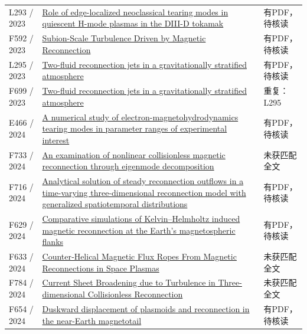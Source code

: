 \documentclass[UTF8,a4paper,11pt,openany,fontset=fandol]{ctexbook}
\begin{document}
\begin{longtable}{P{24mm}P{97mm}P{27mm}}
L293 / 2023 & \href{https://doi.org/10.1063/5.0137123}{Role of edge-localized neoclassical tearing modes in quiescent H-mode plasmas in the DIII-D tokamak} & 有PDF，待核读\\

F592 / 2023 & \href{https://doi.org/10.1103/physrevlett.130.205201}{Subion-Scale Turbulence Driven by Magnetic Reconnection} & 有PDF，待核读\\

L295 / 2023 & \href{https://doi.org/10.1051/0004-6361/202346659}{Two-fluid reconnection jets in a gravitationally stratified atmosphere} & 有PDF，待核读\\

F699 / 2023 & \href{https://doi.org/10.48550/arxiv.2307.05736}{Two-fluid reconnection jets in a gravitationally stratified atmosphere} & 重复：L295\\

E466 / 2024 & \href{https://doi.org/10.1063/5.0205061}{A numerical study of electron-magnetohydrodynamics tearing modes in parameter ranges of experimental interest} & 有PDF，待核读\\

F733 / 2024 & \href{https://doi.org/10.1063/5.0226026}{An examination of nonlinear collisionless magnetic reconnection through eigenmode decomposition} & 未获匹配全文\\

F716 / 2024 & \href{https://doi.org/10.3389/fphy.2024.1439949}{Analytical solution of steady reconnection outflows in a time-varying three-dimensional reconnection model with generalized spatiotemporal distributions} & 有PDF，待核读\\

F629 / 2024 & \href{https://doi.org/10.1063/5.0191674}{Comparative simulations of Kelvin–Helmholtz induced magnetic reconnection at the Earth's magnetospheric flanks} & 有PDF，待核读\\

F633 / 2024 & \href{https://doi.org/10.1029/2024gl108270}{Counter‐Helical Magnetic Flux Ropes From Magnetic Reconnections in Space Plasmas} & 未获匹配全文\\

F784 / 2024 & \href{https://doi.org/10.3847/1538-4357/ad7f54}{Current Sheet Broadening due to Turbulence in Three-dimensional Collisionless Reconnection} & 未获匹配全文\\

F654 / 2024 & \href{https://doi.org/10.1186/s40623-024-02003-w}{Duskward displacement of plasmoids and reconnection in the near-Earth magnetotail} & 有PDF，待核读\\


\end{longtable}
\end{document}
